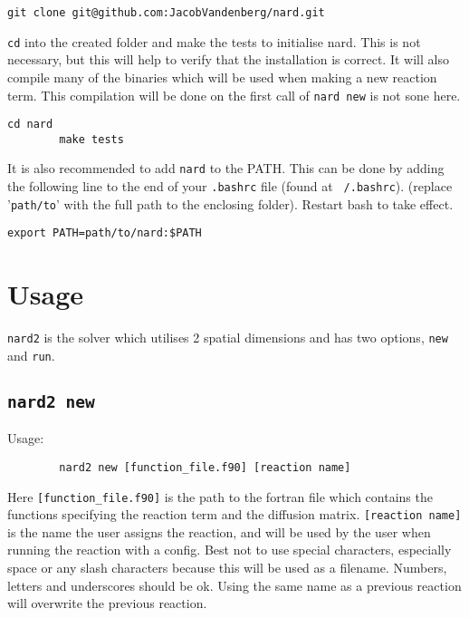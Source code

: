 \documentclass[11pt]{article}
\begin{document}
    \begin{lstlisting}[label={lst:clone}]
        git clone git@github.com:JacobVandenberg/nard.git
    \end{lstlisting}

    \texttt{cd} into the created folder and make the tests to initialise nard.
    This is not necessary, but this will help to verify that the installation is correct. It will also compile many of the binaries which will be used when making a new reaction term. This compilation will be done on the first call of \texttt{nard new} is not sone here.
    \begin{lstlisting}[label={lst:cd}]
        cd nard
        make tests
    \end{lstlisting}

    It is also recommended to add \texttt{nard} to the PATH.
    This can be done by adding the following line to the end of your \texttt{.bashrc} file (found at \texttt{~/.bashrc}).
    (replace '\texttt{path/to}' with the full path to the enclosing folder). Restart bash to take effect.
    \begin{lstlisting}[label={lst:path}]
        export PATH=path/to/nard:$PATH
    \end{lstlisting}

    \section[Usage]{Usage}
    \texttt{nard2} is the solver which utilises 2 spatial dimensions and has two options, \texttt{new} and \texttt{run}.
    \subsection[\texttt{nard2 new}]{\texttt{nard2 new}}
    Usage:
    \begin{lstlisting}
        nard2 new [function_file.f90] [reaction name]
    \end{lstlisting}
    Here \texttt{[function\_file.f90]} is the path to the fortran file which contains the functions specifying the reaction term and the diffusion matrix.
    \texttt{[reaction name]} is the name the user assigns the reaction, and will be used by the user when running the reaction with a config.
    Best not to use special characters, especially space or any slash characters because this will be used as a filename.
    Numbers, letters and underscores should be ok.
    Using the same name as a previous reaction will overwrite the previous reaction.
\end{document}
